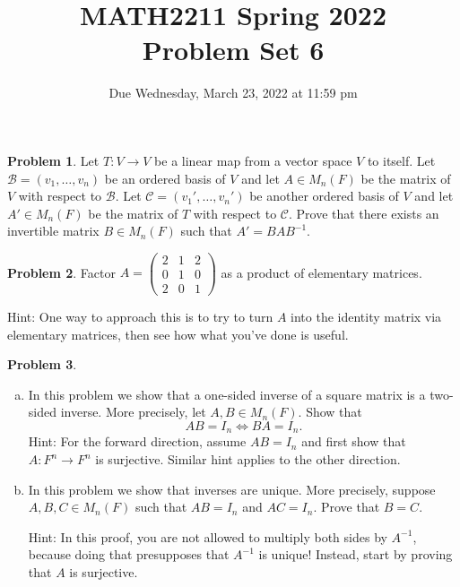 \documentclass[11pt,oneside]{amsart}
\title{MATH2211 Spring 2022\\
Problem Set 6}
\author{Due Wednesday, March 23, 2022 at 11:59 pm}
\theoremstyle{definition}
\newtheorem{problem}{Problem}
\begin{document}
    \maketitle
    
    \begin{problem}
        Let $T\colon V\to V$ be a linear map from a vector space $V$ to itself. Let $\mathcal B=(v_1,\dots,v_n)$ be an ordered basis of $V$ and let $A\in M_n(F)$ be the matrix of $V$ with respect to $\mathcal B$. Let $\mathcal C=(v_1',\dots,v_n')$ be another ordered basis of $V$ and let $A'\in M_n(F)$ be the matrix of $T$ with respect to $\mathcal C$. Prove that there exists an invertible matrix $B\in M_n(F)$ such that $A'=BAB^{-1}$.
    \end{problem}

    \begin{problem}
        Factor $A=\begin{pmatrix}2&1&2\\0&1&0\\2&0&1\end{pmatrix}$ as a product of elementary matrices.

        Hint: One way to approach this is to try to turn $A$ into the identity matrix via elementary matrices, then see how what you've done is useful.
    \end{problem}

    \begin{problem}
        \leavevmode\begin{enumerate}[(a)]
            \item In this problem we show that a one-sided inverse of a square matrix is a two-sided inverse. More precisely, let $A,B\in M_n(F)$. Show that
            \[AB=I_n\iff BA=I_n.\]
            Hint: For the forward direction, assume $AB=I_n$ and first show that $A\colon F^n\to F^n$ is surjective. Similar hint applies to the other direction.

            \item In this problem we show that inverses are unique. More precisely, suppose $A,B,C\in M_n(F)$ such that $AB=I_n$ and $AC=I_n$. Prove that $B=C$.
            
            Hint: In this proof, you are not allowed to multiply both sides by $A^{-1}$, because doing that presupposes that $A^{-1}$ is unique! Instead, start by proving that $A$ is surjective.
        \end{enumerate}
    \end{problem}
\end{document}
